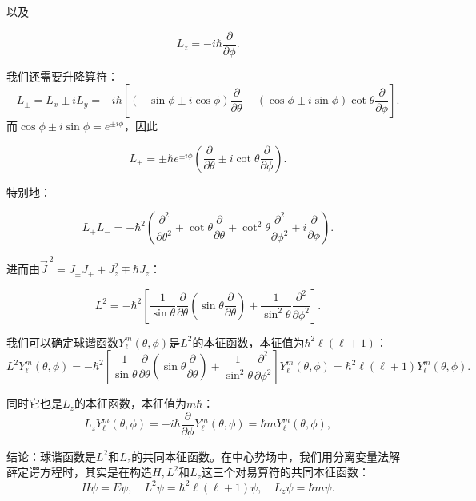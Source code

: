以及

\begin{equation}\label{eq:4.129}
	L_z = -i\hbar \frac{\partial}{\partial \phi}.
\end{equation}


我们还需要升降算符：
\[
L_\pm = L_x \pm iL_y = -i\hbar \left[ (-\sin\phi \pm i\cos\phi)\frac{\partial}{\partial \theta} - (\cos\phi \pm i\sin\phi)\cot\theta \frac{\partial}{\partial \phi} \right].
\]
而$\cos\phi \pm i\sin\phi = e^{\pm i\phi}$，因此

\begin{equation}\label{eq:4.130}
	L_\pm = \pm\hbar e^{\pm i\phi} \left( \frac{\partial}{\partial \theta} \pm i\cot\theta \frac{\partial}{\partial \phi} \right).
\end{equation}


特别地：

\begin{equation}\label{eq:4.131}
	L_+L_- = -\hbar^2 \left( \frac{\partial^2}{\partial \theta^2} + \cot\theta \frac{\partial}{\partial \theta} + \cot^2\theta \frac{\partial^2}{\partial \phi^2} + i\frac{\partial}{\partial \phi} \right).
\end{equation}

进而由$\vec{J}^{\,2} = J_\pm J_\mp + J_z^2 \mp \hbar J_z $：

\begin{equation}\label{eq:4.132}
	L^2 = -\hbar^2 \left[ \frac{1}{\sin\theta}\frac{\partial}{\partial \theta}\left( \sin\theta \frac{\partial}{\partial \theta} \right) + \frac{1}{\sin^2\theta}\frac{\partial^2}{\partial \phi^2} \right].
\end{equation}


我们可以确定球谐函数$Y_\ell^m(\theta, \phi)$是$L^2$的本征函数，本征值为$\hbar^2 \ell(\ell + 1)$：
\[
L^2 Y_\ell^m(\theta, \phi) = -\hbar^2 \left[ \frac{1}{\sin\theta}\frac{\partial}{\partial \theta}\left( \sin\theta \frac{\partial}{\partial \theta} \right) + \frac{1}{\sin^2\theta}\frac{\partial^2}{\partial \phi^2} \right] Y_\ell^m(\theta, \phi) = \hbar^2 \ell(\ell + 1) Y_\ell^m(\theta, \phi).
\]

同时它也是$L_z$的本征函数，本征值为$m\hbar$：
\[
L_z Y_\ell^m(\theta, \phi) = -i\hbar \frac{\partial}{\partial \phi} Y_\ell^m(\theta, \phi) = \hbar m Y_\ell^m(\theta, \phi),
\]

结论：球谐函数是$L^2$和$L_z$的共同本征函数。在中心势场中，我们用分离变量法解薛定谔方程时，其实是在构造$H, L^2$和$L_z$这三个对易算符的共同本征函数：
\begin{equation}\label{eq:4.133}
	H\psi = E\psi,\quad L^2\psi = \hbar^2 \ell(\ell + 1)\psi,\quad L_z\psi = \hbar m \psi.
\end{equation}


